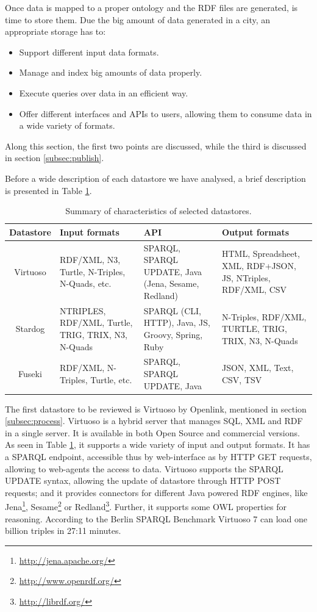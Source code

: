 Once data is mapped to a proper ontology and the RDF files are generated, is time to store them. Due the big amount of data generated in a city, an appropriate storage has to:

\begin{itemize}
    \item Support different input data formats.
    \item Manage and index big amounts of data properly.
    \item Execute queries over data in an efficient way.
    \item Offer different interfaces and APIs to users, allowing them to consume data in a wide variety of formats.
\end{itemize}

Along this section, the first two points are discussed, while the third is discussed in section \ref{subsec:publish}.

Before a wide description of each datastore we have analysed, a brief description is presented in Table \ref{tab:datastores}.

\begin{table}
    \center
    \begin{tabular}{|c|p{2.8cm}|p{2.8cm}|p{2.8cm}|}
        \hline
        \textbf{Datastore} & \textbf{Input formats} & \textbf{API} & \textbf{Output formats} \\
        \hline \hline
        Virtuoso & RDF/XML, N3, Turtle, N-Triples, N-Quads, etc. & SPARQL, SPARQL UPDATE, Java (Jena, Sesame, Redland) & HTML, Spreadsheet, XML, RDF+JSON, JS, NTriples, RDF/XML, CSV \\
        \hline
        Stardog & NTRIPLES, RDF/XML, Turtle, TRIG, TRIX, N3, N-Quads & SPARQL (CLI, HTTP), Java, JS, Groovy, Spring, Ruby & N-Triples, RDF/XML, TURTLE, TRIG, TRIX, N3, N-Quads \\
        \hline
        Fuseki & RDF/XML, N-Triples, Turtle, etc. & SPARQL, SPARQL UPDATE, Java & JSON, XML, Text, CSV, TSV \\
        \hline
    \end{tabular}
    \caption{Summary of characteristics of selected datastores.}
    \label{tab:datastores}
\end{table}

The first datastore to be reviewed is Virtuoso by Openlink, mentioned in section \ref{subsec:process}. Virtuoso is a hybrid server that manages SQL, XML and RDF in a single server. It is available in both Open Source and commercial versions. As seen in Table \ref{tab:datastores}, it supports a wide variety of input and output formats. It has a SPARQL endpoint, accessible thus by web-interface as by HTTP GET requests, allowing to web-agents the access to data. Virtuoso supports the SPARQL UPDATE syntax, allowing the update of datastore through HTTP POST requests; and it provides connectors for different Java powered RDF engines, like Jena\footnote{\url{http://jena.apache.org/}}, Sesame\footnote{\url{http://www.openrdf.org/}} or Redland\footnote{\url{http://librdf.org/}}. Further, it supports some OWL properties for reasoning. According to the Berlin SPARQL Benchmark \cite{bizer2009berlin} Virtuoso 7 can load one billion triples in 27:11 minutes.

